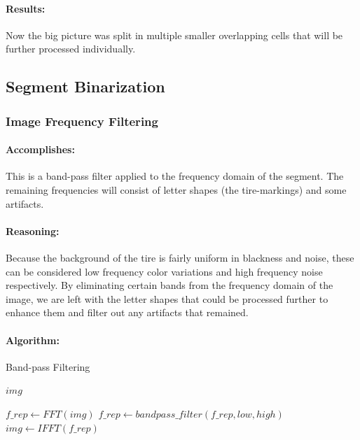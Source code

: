 \paragraph*{Results:}\mbox{}\par
Now the big picture was split in multiple smaller overlapping cells that will be further processed individually.

\subsection{Segment Binarization}

\subsubsection{Image Frequency Filtering}
\label{subsubsec:frequency-filtering}

\paragraph*{Accomplishes:}\mbox{}\par
This is a band-pass filter applied to the frequency domain of the segment. The remaining frequencies will consist of letter shapes (the tire-markings) and some artifacts.

\paragraph*{Reasoning:}\mbox{}\par
Because the background of the tire is fairly uniform in blackness and noise, these can be considered low frequency color variations and high frequency noise respectively. By eliminating certain bands from the frequency domain of the image, we are left with the letter shapes that could be processed further to enhance them and filter out any artifacts that remained.

\paragraph*{Algorithm:}\mbox{}\par

\begin{algorithm}
    \caption{Band-pass Filtering}\label{alg:frequency-filtering}
    \begin{algorithmic}[1]
        \Require $img$

        \State $f\_rep \gets FFT(img)$
        \State $f\_rep \gets bandpass\_filter(f\_rep, low, high)$
        \State $img \gets IFFT(f\_rep)$

    \end{algorithmic}
\end{algorithm}

